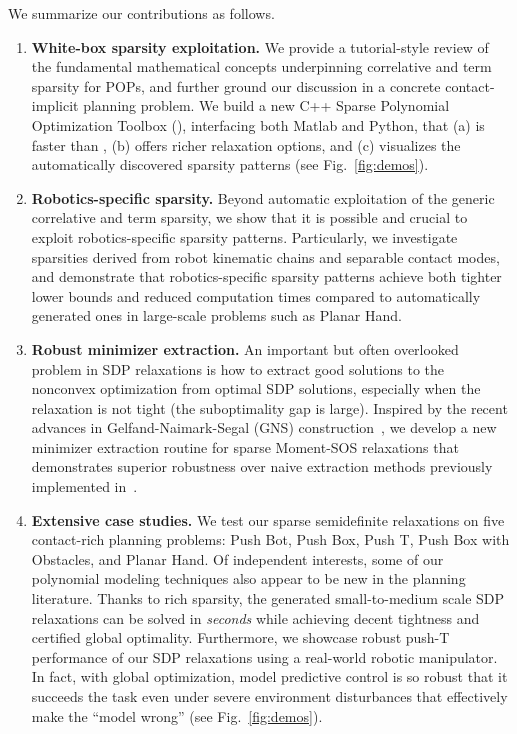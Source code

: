 We summarize our contributions as follows. 
\begin{enumerate}[label=(\Roman*)]
    \item \textbf{White-box sparsity exploitation.} 
    We provide a tutorial-style review of the fundamental mathematical concepts underpinning correlative and term sparsity for POPs, and further ground our discussion in a concrete contact-implicit planning problem. 
    We build a new C++ Sparse Polynomial Optimization Toolbox (\spot), interfacing both Matlab and Python, that (a) is faster than \tssos, (b) offers richer relaxation options, and (c) visualizes the automatically discovered sparsity patterns (see Fig.~\ref{fig:demos}).
    \item \textbf{Robotics-specific sparsity.} Beyond automatic exploitation of the generic correlative and term sparsity, we show that it is possible and crucial to exploit robotics-specific sparsity patterns. Particularly, we investigate sparsities derived from robot kinematic chains and separable contact modes, and demonstrate that robotics-specific sparsity patterns achieve both tighter lower bounds and reduced computation times compared to automatically generated ones in large-scale problems such as Planar Hand. 
    \item \textbf{Robust minimizer extraction.} 
    An important but often overlooked problem in SDP relaxations is how to extract good solutions to the nonconvex optimization from optimal SDP solutions, especially when the relaxation is not tight (\ie the suboptimality gap is large).  
    Inspired by the recent advances in Gelfand-Naimark-Segal (GNS) construction~\cite{klep2018siopt-minimizer-extraction-robust}, we develop a new minimizer extraction routine for sparse Moment-SOS relaxations that demonstrates superior robustness over naive extraction methods previously implemented in~\cite{kang2024wafr-strom,magron2021arxiv-julia-tssos}.
    \item \textbf{Extensive case studies.} We test our sparse semidefinite relaxations on five contact-rich planning problems: Push Bot, Push Box, Push T, Push Box with Obstacles, and Planar Hand. 
    Of independent interests, some of our polynomial modeling techniques also appear to be new in the planning literature. 
    Thanks to rich sparsity, the generated small-to-medium scale SDP relaxations can be solved in \textit{seconds} while achieving decent tightness and certified global optimality.
    Furthermore, we showcase robust push-T performance of our SDP relaxations using a real-world robotic manipulator. In fact, with global optimization, model predictive control is so robust that it succeeds the task even under severe environment disturbances that effectively make the ``model wrong'' (see Fig.~\ref{fig:demos}). 
\end{enumerate}

